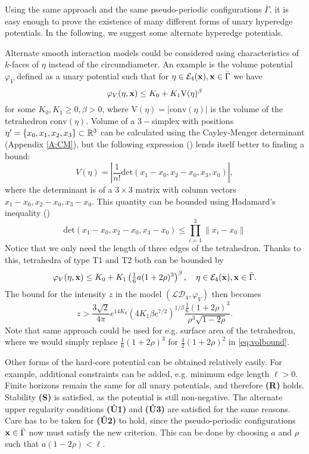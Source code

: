 Using the same approach and the same pseudo-periodic configurations $\bar\Gamma$, it is easy enough to prove the existence of many different forms of unary hyperedge potentials. In the following, we suggest some alternate hyperedge potentials. 
\begin{remark}
	
	Alternate smooth interaction models could be considered using characteristics of $k$-faces of $\eta$ instead of the circumdiameter. An example is the volume potential $\varphi_{V}$ defined as a unary potential such that for $\eta\in\mathcal E_4({\mathbf{x}}), {\mathbf{x}} \in \bar\Gamma$  we have
	$$\varphi_{V}(\eta,{\mathbf{x}}) \leq K_0 + K_1 \mathrm{V}(\eta)^{\beta}$$
	for some $K_0,K_1 \geq 0, \beta >0$, where $\mathrm{V}(\eta)=|\mathrm{conv}(\eta)|$ is the volume of the tetrahedron $\mathrm{conv}(\eta)$. Volume of a $3-$simplex with positions $\eta'=\{x_0,x_1,x_2,x_3\}\subset {\mathbb R^3}$ can be calculated using the Cayley-Menger determinant (Appendix \ref{A:CM}), but the following expression (\cite{Stein1966}) lends itself better to finding a bound: 
	$$V(\eta)=\left| \frac 1{n!} \mathrm{det}(x_1-x_0,x_2-x_0,x_3,x_0) \right|,$$
	where the determinant is of a $3 \times 3$ matrix with column vectors $x_1-x_0,x_2-x_0,x_3-x_0$. This quantity can be bounded using Hadamard's inequality (\cite{Hadamard1893})
	$$\mathrm{det}(x_1-x_0,x_2-x_0,x_3-x_0) \leq \prod^3_{i=1} \|x_i - x_0\| $$
	Notice that we only need the length of three edges of the tetrahedron. Thanks to this, tetrahedra of type T1 and T2 both can be bounded by
	$$\varphi_V(\eta,{\mathbf{x}}) \leq K_0 + K_1 \left(\tfrac 16 a(1+2\rho)^3\right)^{\beta}, \quad \eta\in\mathcal E_4({\mathbf{x}}), {\mathbf{x}}\in \bar \Gamma.$$
	The bound for the intensity $z$ in the model $(\mathcal {LD}_4, \varphi_V)$ then becomes
	\begin{equation}\label{eq:volbound}z> \frac{3\sqrt 2}{4\pi}e^{14 K_0}   (4K_1 \beta e^{7/2})^{1/\beta} \frac{\frac 16 (1+2\rho)^3}{\rho^3 \sqrt{1-2\rho}}.\end{equation}
	Note that same approach could be used for e.g. surface area of the tetrahedron, where we would simply replace $\tfrac 16 (1+2\rho)^3$ for $\tfrac 42 (1+2\rho)^2$ in \eqref{eq:volbound}.  \newline

\end{remark}


\begin{remark}
	Other forms of the hard-core potential can be obtained relatively easily. For example, additional constraints can be added, e.g. minimum edge length $\ell>0$. Finite horizons remain the same for all unary potentials, and therefore \textbf{(R)} holds. Stability \textbf{(S)} is satisfied, as the potential is still non-negative. The alternate upper regularity conditions \textbf{(\^{U}1)} and \textbf{(\^{U}3)} are satisfied for the same reasons. Care has to be taken for \textbf{(\^{U}2)} to hold, since the pseudo-periodic configurations ${\mathbf{x}}\in\bar \Gamma$ now must satisfy the new criterion. This can be done by choosing $a$ and $\rho$ such that $a(1-2\rho) < \ell$.
\end{remark}

